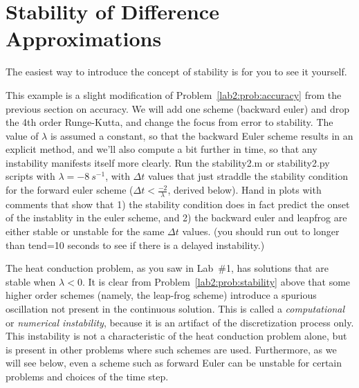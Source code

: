 % 
%
%
%
%
%
%
%

\section{Stability of Difference Approximations}
\label{lab2:sec:stability}

The easiest way to introduce the concept of stability is for you to
see it yourself.

\begin{problem}
  \label{lab2:prob:stability}
  This example is a slight modification of
  Problem~\ref{lab2:prob:accuracy} from the previous section on
  accuracy.  We will add one scheme (backward euler) and drop the
  4th order Runge-Kutta, and change the focus from error to
  stability.  The value of $\lambda$ is assumed a constant, so that the
  backward Euler scheme results in an explicit method, and we'll also
  compute a bit further in time, so that any instability manifests
  itself more clearly.  Run the stability2.m or stability2.py
  scripts with $\lambda= -8\ s^{-1}$, with $\Delta t$ values that
  just straddle the stability condition for the forward euler
  scheme ($\Delta t < \frac{-2}{\lambda}$, derived below).  Hand in plots with comments that show that
  1) the stability condition does in fact predict the onset of the instablity
  in the euler scheme, and 2) the backward euler and leapfrog are
  either stable or unstable for the same $\Delta t$ values. (you
  should run out to longer than tend=10 seconds to see if there
  is a delayed instability.)

  \end{problem}

The heat conduction problem, as you saw in
Lab~\#1, has solutions that are
stable when $\lambda<0$.  
It is clear from Problem~\ref{lab2:prob:stability} above that some
higher order schemes 
(namely, the leap-frog scheme) introduce a spurious oscillation not
present in the continuous solution.
This is called a \emph{ computational} or \emph{ numerical instability},
because it is an artifact of the discretization process only.
This instability is not a characteristic of the heat conduction
problem alone, but is present in other problems where such schemes are
used.  Furthermore, as we will see below, even a scheme such as
forward Euler can be unstable for certain problems and choices of the
time step.

